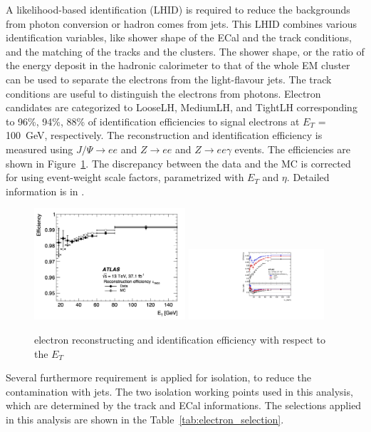 A likelihood-based identification (LHID) is required to reduce the backgrounds from photon conversion or hadron comes from jets. 
This LHID combines various identification variables, like shower shape of the ECal and the track conditions, and the matching of the tracks and the clusters.
The shower shape, or the ratio of the energy deposit in the hadronic calorimeter to that of the whole EM cluster can be used to separate the electrons from the light-flavour jets. The track conditions are useful to distinguish the electrons from photons.
Electron candidates are categorized to LooseLH, MediumLH, and TightLH corresponding to 96\%, 94\%, 88\% of identification efficiencies to signal electrons at $E_T$ = 100~GeV, respectively.
The reconstruction and identification efficiency is measured using  $J/\Psi \rightarrow ee$ and $Z\rightarrow ee$ and $Z\rightarrow ee\gamma$ events. The efficiencies are shown in Figure~\ref{fig:recoElectron}. The discrepancy between the data and the MC is corrected for using event-weight scale factors, parametrized with $E_T$ and $\eta$. Detailed information is in \cite{PERF-2017-01}.
\begin{figure}[tbp]
\begin{center}
 \includegraphics[width=0.50\textwidth,keepaspectratio]{figures/Reconstruction/recoElectron}
 \includegraphics[width=0.45\textwidth,keepaspectratio]{figures/Reconstruction/idElectron}
\caption{
electron reconstructing and identification efficiency with respect to the $E_T$
}
\label{fig:recoElectron}
\end{center}
\end{figure}
Several furthermore requirement is applied for isolation, to reduce the contamination with jets. The two isolation working points used in this analysis, which are determined by the track and ECal informations. The selections applied in this analysis are shown in the Table~\ref{tab:electron_selection}.
